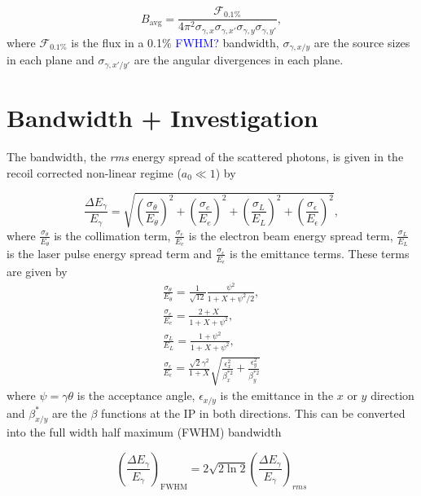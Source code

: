 \documentclass[../main.tex]{subfiles}
\begin{document}
\begin{equation}
B_{\mathrm{avg}} = \frac{\mathcal{F}_{0.1\%}}{4\pi^{2}\sigma_{\gamma,x}\sigma_{\gamma,x'}\sigma_{\gamma,y}\sigma_{\gamma,y'}},
\label{eq:average_brightness}
\end{equation}
where $\mathcal{F}_{0.1\%}$ is the flux in a 0.1\% \textcolor{blue}{FWHM?} bandwidth, $\sigma_{\gamma,x/y}$ are the source sizes in each plane and $\sigma_{\gamma,x'/y'}$ are the angular divergences in each plane.


\section{Bandwidth + Investigation}

The bandwidth, the \textit{rms} energy spread of the scattered photons, is given in the recoil corrected non-linear regime ($a_{0}\ll 1$) \cite{ranjan2018simulation} by

\begin{equation}
\frac{\Delta E_{\gamma}}{E_{\gamma}} = \sqrt{\left(\frac{\sigma_{\theta}}{E_{\theta}}\right)^{2}+\left(\frac{\sigma_{e}}{E_{e}}\right)^{2}+\left(\frac{\sigma_{L}}{E_{L}}\right)^{2}+\left(\frac{\sigma_{\epsilon}}{E_{\epsilon}}\right)^{2}},
\label{eq:RMS_bandwidth}    
\end{equation}
where $\frac{\sigma_{\theta}}{E_{\theta}}$ is the collimation term, $\frac{\sigma_{e}}{E_{e}}$ is the electron beam energy spread term, $\frac{\sigma_{L}}{E_{L}}$ is the laser pulse energy spread term and $\frac{\sigma_{\epsilon}}{E_{\epsilon}}$ is the emittance terms. These terms are given by
\begin{gather}
\frac{\sigma_{\theta}}{E_{\theta}} = \frac{1}{\sqrt{12}}\frac{\psi^{2}}{1+X+\psi^{2}/2},
\label{eq:collimation_term} \\
\frac{\sigma_{e}}{E_{e}} = \frac{2+X}{1+X+\psi^{2}},
\label{eq:beam_energy_spread_term} \\
\frac{\sigma_{L}}{E_{L}} = \frac{1+\psi^{2}}{1+X+\psi^{2}},
\label{eq:laser_energy_spread_term} \\
\frac{\sigma_{\epsilon}}{E_{\epsilon}} = \frac{\sqrt{2}\gamma^{2}}{1+X}\sqrt{\frac{\epsilon_{x}^{2}}{\beta_{x}^{*2}}+\frac{\epsilon_{y}^{2}}{\beta_{y}^{*2}}}
\label{eq:emittance_term}
\end{gather}
where $\psi = \gamma\theta$ is the acceptance angle, $\epsilon_{x/y}$ is the emittance in the $x$ or $y$ direction and $\beta_{x/y}^{*}$ are the $\beta$ functions at the IP in both directions. This can be converted into the full width half maximum (FWHM) bandwidth 

\begin{equation}
\left(\frac{\Delta E_{\gamma}}{E_{\gamma}}\right)_{\mathrm{FWHM}} = 2\sqrt{2\ln{2}}\left(\frac{\Delta E_{\gamma}}{E_{\gamma}}\right)_{rms}
\label{eq:FWHM_bandwidth}
\end{equation}
\end{document}
